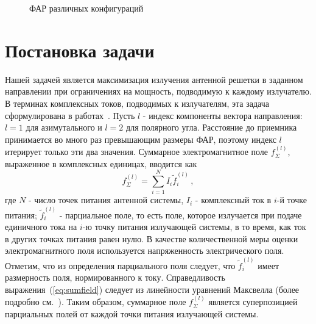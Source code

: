 \begin{figure}
    \begin{minipage}[h]{0.49\linewidth}
    \end{minipage}
    \hfill
    \begin{minipage}[h]{0.49\linewidth}
    \end{minipage}
    \begin{minipage}[h]{0.49\linewidth}
    \end{minipage}
    \hfill
    \begin{minipage}[h]{0.49\linewidth}
    \end{minipage}
    \caption{ФАР различных конфигураций}
    \label{ris:bve_bvd}
\end{figure}


\section{Постановка задачи}\label{sec:statement}
Нашей задачей является максимизация излучения антенной решетки в заданном направлении при ограничениях на мощность, подводимую к каждому
излучателю. В терминах комплексных токов, подводимых к излучателям, эта задача сформулирована в работах~\cite{yurkov:farkv,yurkov:knd}.
Пусть $l$ - индекс компоненты вектора направления: $l=1$ для азимутального и $l=2$ для полярного угла. Расстояние до приемника принимается во много раз превышающим размеры ФАР, поэтому индекс $l$ итерирует только эти два значения.
Суммарное электромагнитное поле $f^{(l)}_{\Sigma}$, выраженное в комплексных единицах, вводится как
%
\begin{equation}
    f^{(l)}_{\Sigma} = \sum_{i=1}^{N}I_i \tilde{f}_i^{(l)} \, ,
    \label{eq:sumfield}
\end{equation}
%
где $N$ - число точек питания антенной системы, $I_i$ - комплексный ток в $i$-й точке питания; $\tilde{f}_i^{(l)}$ - парциальное поле, то есть поле, которое излучается при подаче единичного тока на $i$-ю точку питания излучающей системы, в то время, как ток в других точках питания равен нулю. В качестве количественной меры оценки электромагнитного поля используется напряженность электрического поля. Отметим, что из определения парциального поля следует, что $\tilde{f}_i^{(l)}$ имеет размерность поля, нормированного к току. Справедливость выражения~(\ref{eq:sumfield}) следует из линейности уравнений Максвелла (более подробно см.~\cite{yurkov:farkv}). Таким образом, суммарное поле $f^{(l)}_{\Sigma}$ является суперпозицией парциальных полей от каждой точки питания излучающей системы.

